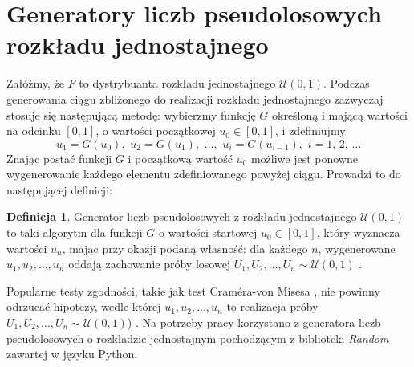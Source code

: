 \documentclass[inzynierska]{pwr_wmat_praca_dyplomowa}
\theoremstyle{plain}
\numberwithin{theorem}{chapter}
\theoremstyle{definition}
\numberwithin{theorem}{chapter}
\newtheorem{definition}[theorem]{Definicja}
\begin{document}
\section{Generatory liczb pseudolosowych rozkładu jednostajnego} %
Załóżmy, że $F$ to dystrybuanta rozkładu jednostajnego $\mathcal{U}(0,1)$.  Podczas generowania ciągu zbliżonego do realizacji rozkładu jednostajnego zazwyczaj stosuje się następującą metodę: wybierzmy funkcję $G$ określoną i mającą wartości na odcinku $[0,1]$, o wartości początkowej $u_0 \in [0,1]$, i zdefiniujmy
\begin{equation}
	u_1=G(u_0), \,\, u_2=G(u_1), \,\, \dots, \,\,u_i=G(u_{i-1}), \,\, i=1,\,2,\,\dots 
\end{equation}
Znając postać funkcji $G$ i początkową wartość $u_0$ możliwe jest ponowne wygenerowanie każdego elementu zdefiniowanego powyżej ciągu. Prowadzi to do następującej definicji:
\begin{definition}
	Generator liczb pseudolosowych z rozkładu jednostajnego $\mathcal{U}(0,1)$ to taki algorytm dla funkcji $G$ o wartości startowej $u_0 \in [0,1]$, który wyznacza wartości $u_n$, mając przy okazji podaną własność: dla każdego $n$, wygenerowane $u_1,u_2,\dots,u_n$ oddają zachowanie próby losowej $U_1,U_2,\dots,U_n \sim \mathcal{U}(0,1)$ \cite{koronacki}. 
\end{definition}
\noindent Popularne testy zgodności, takie jak test Cram\'era-von Misesa  \cite{cramer}, nie powinny odrzucać hipotezy, wedle której $u_1,u_2,\dots,u_n$ to realizacja próby $U_1,U_2,\dots,U_n \sim \mathcal{U}(0,1)$) \cite{koronacki}. Na potrzeby pracy korzystano z generatora liczb pseudolosowych o rozkładzie jednostajnym pochodzącym z biblioteki \textit{Random} zawartej w języku Python.
\end{document}
